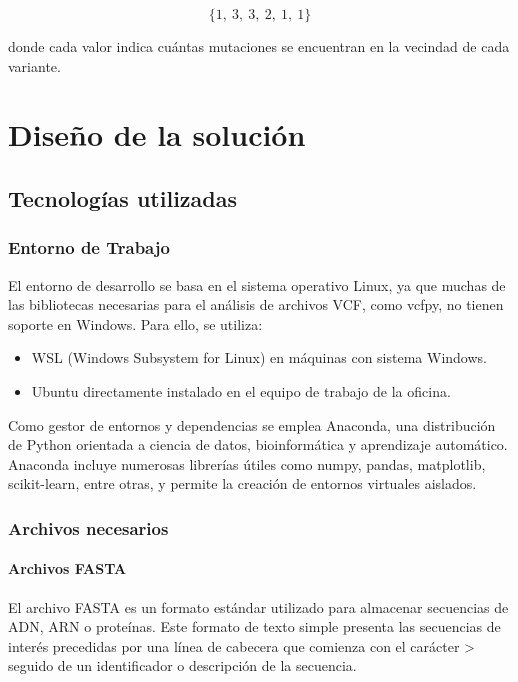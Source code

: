 \documentclass[11pt,spanish,listoffigures,listoftables]{tfgetsinf}
\begin{document}
\[
\{1,\ 3,\ 3,\ 2,\ 1,\ 1\}
\]

donde cada valor indica cuántas mutaciones se encuentran en la vecindad de cada variante.



\chapter{Diseño de la solución }


\section{Tecnologías utilizadas}

\subsection{Entorno de Trabajo}

El entorno de desarrollo se basa en el sistema operativo Linux, ya que muchas de las bibliotecas necesarias para el análisis de archivos \acs{VCF}, como vcfpy, no tienen soporte en Windows. Para ello, se utiliza:
\begin{itemize}
   \item WSL (Windows Subsystem for Linux) en máquinas con sistema Windows.
   \item Ubuntu directamente instalado en el equipo de trabajo de la oficina.
\end{itemize}

Como gestor de entornos y dependencias se emplea Anaconda, una distribución de Python orientada a ciencia de datos, bioinformática y aprendizaje automático. Anaconda incluye numerosas librerías útiles como numpy, pandas, matplotlib, scikit-learn, entre otras, y permite la creación de entornos virtuales aislados.

\subsection{Archivos necesarios}

\subsubsection{Archivos FASTA}

El archivo \acs{FASTA} es un formato estándar utilizado para almacenar secuencias de \acs{ADN}, \acs{ARN} o proteínas. Este formato de texto simple presenta las secuencias de interés precedidas por una línea de cabecera que comienza con el carácter > seguido de un identificador o descripción de la secuencia. 
\end{document}
